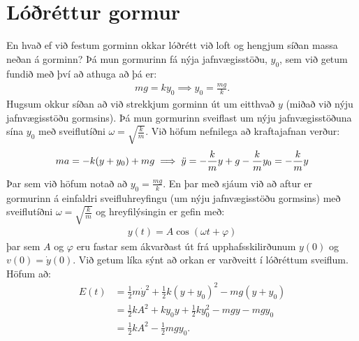 \ifdefined \wholebook \else\documentclass[oneside]{book}\usepackage{EdlBook}\graphicspath{{figures/}}
\begin{document}

\vspace{0.3cm}

\section{Lóðréttur gormur}

En hvað ef við festum gorminn okkar lóðrétt við loft og hengjum síðan massa neðan á gorminn? Þá mun gormurinn fá nýja jafnvægisstöðu, $y_0$, sem við getum fundið með því að athuga að þá er:
\begin{align*}
    mg = ky_0 \implies y_0 = \frac{mg}{k}.
\end{align*}
Hugsum okkur síðan að við strekkjum gorminn út um eitthvað $y$ (miðað við nýju jafnvægisstöðu gormsins). Þá mun gormurinn sveiflast um nýju jafnvægisstöðuna sína $y_0$ með sveiflutíðni $\omega = \sqrt{\frac{k}{m}}$. Við höfum nefnilega að kraftajafnan verður:
\begin{align*}
    ma = -k(y+y_0) + mg \implies \Ddot{y} =  -\frac{k}{m}y + g - \frac{k}{m}y_0 = -\frac{k}{m}y
\end{align*}
Þar sem við höfum notað að $y_0 = \frac{mg}{k}$. En þar með sjáum við að aftur er gormurinn á einfaldri sveifluhreyfingu (um nýju jafnvægisstöðu gormsins) með sveiflutíðni $\omega = \sqrt{\frac{k}{m}}$ og hreyfilýsingin er gefin með:
\begin{align*}
    y(t) = A \cos(\omega t + \varphi)
\end{align*}
þar sem $A$ og $\varphi$ eru fastar sem ákvarðast út frá upphafsskilirðunum $y(0)$ og $v(0) = \dot{y}(0)$. Við getum líka sýnt að orkan er varðveitt í lóðréttum sveiflum. Höfum að:
\begin{align*}
    E(t) &= \frac{1}{2}m\dot{y}^2 + \frac{1}{2}k(y + y_0)^2 - mg(y+y_0) \\
    &= \frac{1}{2}kA^2 + ky_0y + \frac{1}{2}ky_0^2 - mgy - mgy_0 \\
    &= \frac{1}{2}kA^2 - \frac{1}{2}mgy_0.
\end{align*}
\end{document}
